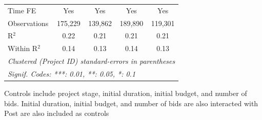 \documentclass[
]{article}
\begin{document}
\begin{table}[htbp]
\begin{tabular}{lcccc}
      Time FE                      & Yes                                                                                           & Yes                                           & Yes                                         & Yes\\  
      Observations                 & 175,229                                                                                       & 139,862                                       & 189,890                                     & 119,301\\  
      R$^2$                        & 0.22                                                                                          & 0.21                                          & 0.21                                        & 0.21\\  
      Within R$^2$                 & 0.14                                                                                          & 0.13                                          & 0.14                                        & 0.13\\  
      \midrule
      \multicolumn{5}{l}{\emph{Clustered (Project ID) standard-errors in parentheses}}\\
      \multicolumn{5}{l}{\emph{Signif. Codes: ***: 0.01, **: 0.05, *: 0.1}}\\
   \end{tabular}
   
   \par \raggedright 
   Controls include project stage, initial duration, initial budget, and number of bids. Initial duration, initial budget, and number of bids are also interacted with Post are also included as controls
\end{table}
\end{document}
